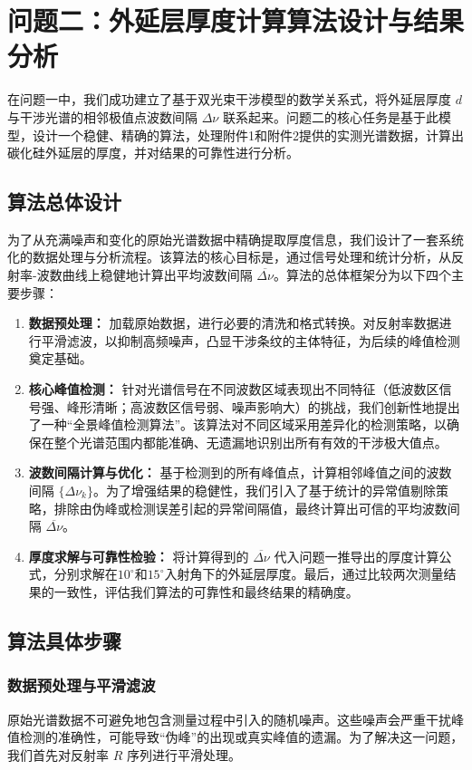 \documentclass[withoutpreface,bwprint]{cumcmthesis} %
\begin{document}
\section{问题二：外延层厚度计算算法设计与结果分析}

在问题一中，我们成功建立了基于双光束干涉模型的数学关系式，将外延层厚度 $d$ 与干涉光谱的相邻极值点波数间隔 $\Delta\nu$ 联系起来。问题二的核心任务是基于此模型，设计一个稳健、精确的算法，处理附件1和附件2提供的实测光谱数据，计算出碳化硅外延层的厚度，并对结果的可靠性进行分析。

\subsection{算法总体设计}
为了从充满噪声和变化的原始光谱数据中精确提取厚度信息，我们设计了一套系统化的数据处理与分析流程。该算法的核心目标是，通过信号处理和统计分析，从反射率-波数曲线上稳健地计算出平均波数间隔 $\overline{\Delta\nu}$。算法的总体框架分为以下四个主要步骤：
\begin{enumerate}
    \item \textbf{数据预处理：} 加载原始数据，进行必要的清洗和格式转换。对反射率数据进行平滑滤波，以抑制高频噪声，凸显干涉条纹的主体特征，为后续的峰值检测奠定基础。
    \item \textbf{核心峰值检测：} 针对光谱信号在不同波数区域表现出不同特征（低波数区信号强、峰形清晰；高波数区信号弱、噪声影响大）的挑战，我们创新性地提出了一种“全景峰值检测算法”。该算法对不同区域采用差异化的检测策略，以确保在整个光谱范围内都能准确、无遗漏地识别出所有有效的干涉极大值点。
    \item \textbf{波数间隔计算与优化：} 基于检测到的所有峰值点，计算相邻峰值之间的波数间隔 $\{\Delta\nu_k\}$。为了增强结果的稳健性，我们引入了基于统计的异常值剔除策略，排除由伪峰或检测误差引起的异常间隔值，最终计算出可信的平均波数间隔 $\overline{\Delta\nu}$。
    \item \textbf{厚度求解与可靠性检验：} 将计算得到的 $\overline{\Delta\nu}$ 代入问题一推导出的厚度计算公式，分别求解在$10^\circ$和$15^\circ$入射角下的外延层厚度。最后，通过比较两次测量结果的一致性，评估我们算法的可靠性和最终结果的精确度。
\end{enumerate}

\subsection{算法具体步骤}

\subsubsection{数据预处理与平滑滤波}
原始光谱数据不可避免地包含测量过程中引入的随机噪声。这些噪声会严重干扰峰值检测的准确性，可能导致“伪峰”的出现或真实峰值的遗漏。为了解决这一问题，我们首先对反射率 $R$ 序列进行平滑处理。
\end{document}
